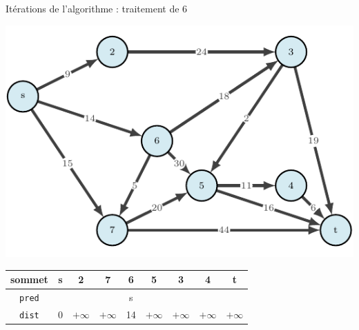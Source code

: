 \begin{frame}{Itérations de l'algorithme : traitement de $6$}
    \begin{center}
        \includegraphics[height=.6\textheight]{fig/ordinal-0.pdf}      
    \begin{tabular}{c|cccccccc}
        
        sommet & s       &2      &7      &6      &5      &3      &4      &t      \\
        \hline
        \texttt{pred} & &       &       &s      &       &       &       &       \\
        \texttt{dist} & 0       &$+\infty$    &$+\infty$    &14     &$+\infty$    &$+\infty$    &$+\infty$    &$+\infty$    \\
    \end{tabular}
\end{center}
\end{frame}

